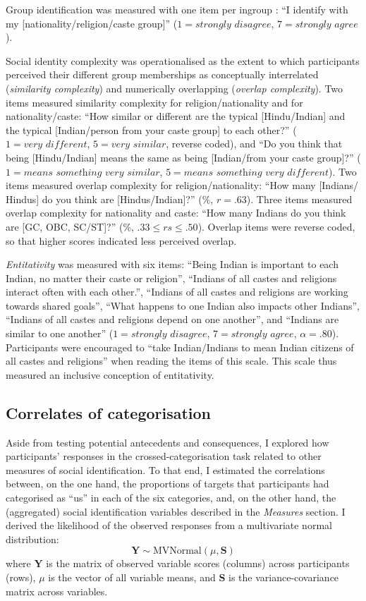 \documentclass[12pt, a4paper]{article}
\begin{document}
Group identification was measured with one item per ingroup \cite{postmes_single_2013}: ``I identify with my [nationality/religion/caste group]'' ($1 = \textit{strongly disagree}$, $7 = \textit{strongly agree}$).

Social identity complexity \cite{roccas_social_2002, schmid_antecedents_2009} was operationalised as the extent to which participants perceived their different group memberships as conceptually interrelated (\emph{similarity complexity}) and numerically overlapping (\emph{overlap complexity}). Two items measured similarity complexity for religion/nationality and for nationality/caste: ``How similar or different are the typical [Hindu/Indian] and the typical [Indian/person from your caste group] to each other?'' ($1 = \textit{very different}$, $5 = \textit{very similar}$, reverse coded), and ``Do you think that being [Hindu/Indian] means the same as being [Indian/from your caste group]?'' ($1 = \textit{means something very similar}$, $5 = \textit{means something very different}$).  Two items measured overlap complexity for religion/nationality: ``How many [Indians/ Hindus] do you think are [Hindus/Indian]?” (\%, $r = .63$). Three items measured overlap complexity for nationality and caste: ``How many Indians do you think are [GC, OBC, SC/ST]?'' (\%, $.33 \leq rs \leq .50$). Overlap items were reverse coded, so that higher scores indicated less perceived overlap.

\emph{Entitativity} \cite{lickel_varieties_2000} was measured with six items: ``Being Indian is important to each Indian, no matter their caste or religion'', ``Indians of all castes and religions interact often with each other.'', ``Indians of all castes and religions are working towards shared goals'', ``What happens to one Indian also impacts other Indians'', ``Indians of all castes and religions depend on one another'', and ``Indians are similar to one another'' ($1 = \textit{strongly disagree}$, $7 = \textit{strongly agree}$, $\alpha = .80$). Participants were encouraged to ``take Indian/Indians to mean Indian citizens of all castes and religions'' when reading the items of this scale. This scale thus measured an inclusive conception of entitativity.

\subsection{Correlates of categorisation}

Aside from testing potential antecedents and consequences, I explored how participants' responses in the crossed-categorisation task related to other measures of social identification. To that end, I estimated the correlations between, on the one hand, the proportions of targets that participants had categorised as ``us'' in each of the six categories, and, on the other hand, the (aggregated) social identification variables described in the \emph{Measures} section. I derived the likelihood of the observed responses from a multivariate normal distribution: $$ \textbf{Y} \sim \text{MVNormal} (\mu , \textbf{S} ) $$ where $\textbf{Y}$ is the matrix of observed variable scores (columns) across participants (rows), $\mu$ is the vector of all variable means, and $\textbf{S}$ is the variance-covariance matrix across variables.
\end{document}
